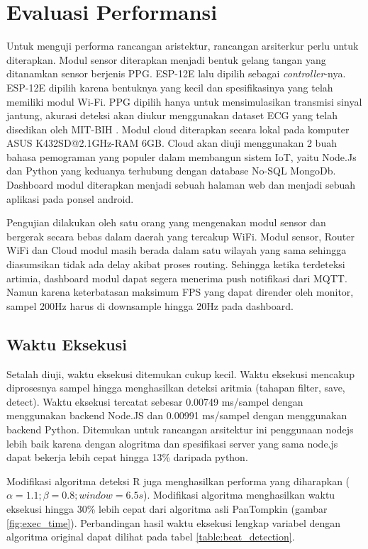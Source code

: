 \documentclass[]{indojc}
\begin{document}
\section{Evaluasi Performansi}
Untuk menguji performa rancangan aristektur, rancangan arsiterkur perlu untuk diterapkan. Modul sensor diterapkan menjadi bentuk gelang tangan yang ditanamkan sensor berjenis PPG. ESP-12E lalu dipilih sebagai \textit{controller}-nya. ESP-12E dipilih karena bentuknya yang kecil dan spesifikasinya yang telah memiliki modul Wi-Fi. PPG dipilih hanya untuk mensimulasikan transmisi sinyal jantung, akurasi deteksi akan diukur menggunakan dataset ECG yang telah disedikan oleh MIT-BIH \cite{mit_bih_paper, physionet}. Modul cloud diterapkan secara lokal pada komputer ASUS K432SD@2.1GHz-RAM 6GB. Cloud akan diuji menggunakan 2 buah bahasa pemograman yang populer dalam membangun sistem IoT, yaitu Node.Js dan Python yang keduanya terhubung dengan database No-SQL MongoDb. Dashboard modul diterapkan menjadi sebuah halaman web dan menjadi sebuah aplikasi pada ponsel android.

Pengujian dilakukan oleh satu orang yang mengenakan modul sensor dan bergerak secara bebas dalam daerah yang tercakup WiFi. Modul sensor, Router WiFi dan Cloud modul masih berada dalam satu wilayah yang sama sehingga diasumsikan tidak ada delay akibat proses routing. Sehingga ketika terdeteksi artimia, dashboard modul dapat segera menerima push notifikasi dari MQTT. Namun karena keterbatasan maksimum FPS yang dapat dirender oleh monitor, sampel 200Hz harus di downsample hingga 20Hz pada dashboard.

\subsection{Waktu Eksekusi}
Setalah diuji, waktu eksekusi ditemukan cukup kecil. Waktu eksekusi mencakup diprosesnya sampel hingga menghasilkan deteksi aritmia (tahapan filter, save, detect). Waktu eksekusi tercatat sebesar 0.00749 ms/sampel dengan menggunakan backend Node.JS dan 0.00991 ms/sampel dengan menggunakan backend Python. Ditemukan untuk rancangan arsitektur ini penggunaan nodejs lebih baik karena dengan alogritma dan spesifikasi server yang sama node.js dapat bekerja lebih cepat hingga 13\% daripada python.

Modifikasi algoritma deteksi R juga menghasilkan performa yang diharapkan ($\alpha = 1.1; \beta = 0.8; window = 6.5s$). Modifikasi algoritma menghasilkan waktu eksekusi hingga 30\% lebih cepat dari algoritma asli PanTompkin (gambar \ref{fig:exec_time}). Perbandingan hasil waktu eksekusi lengkap variabel dengan algoritma original dapat dilihat pada tabel \ref{table:beat_detection}.
\end{document}
